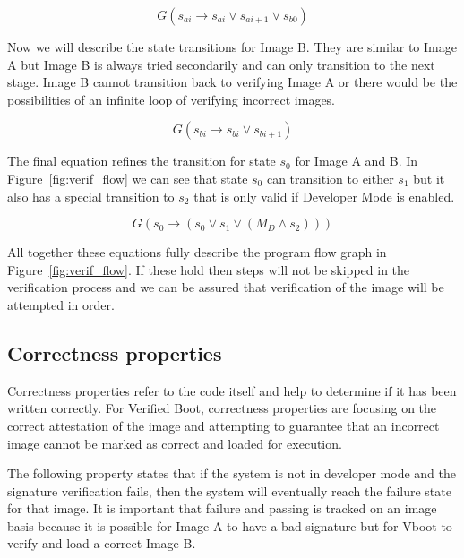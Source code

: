 \begin{equation}
    G(s_{ai} \to s_{ai} \lor s_{ai+1} \lor s_{b0})
\end{equation}

Now we will describe the state transitions for Image B. 
They are similar to Image A but Image B is always tried secondarily and can only transition to the next stage. 
Image B cannot transition back to verifying Image A or there would be the possibilities of an infinite loop of verifying incorrect images.

\begin{equation}
    G(s_{bi} \to s_{bi} \lor s_{bi+1})
\end{equation}

The final equation refines the transition for state $s_0$ for Image A and B.
In Figure~\ref{fig:verif_flow} we can see that state $s_0$ can transition to either $s_1$ but it also has a special transition to $s_2$ that is only valid if Developer Mode is enabled.

\begin{equation}
    G(s_0 \to (s_0 \lor s_{1} \lor (M_D \land s_{2})))
\end{equation}

All together these equations fully describe the program flow graph in Figure~\ref{fig:verif_flow}. 
If these hold then steps will not be skipped in the verification process and we can be assured that verification of the image will be attempted in order.

\subsection{Correctness properties}

Correctness properties refer to the code itself and help to determine if it has been written correctly.
For Verified Boot, correctness properties are focusing on the correct attestation of the image and attempting to guarantee that an incorrect image cannot be marked as correct and loaded for execution.

The following property states that if the system is not in developer mode and the signature verification fails, then the system will eventually reach the failure state for that image.
It is important that failure and passing is tracked on an image basis because it is possible for Image A to have a bad signature but for Vboot to verify and load a correct Image B.

